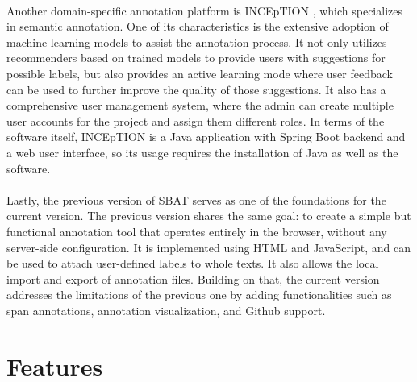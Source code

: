 \documentclass[12ptm a4paper]{article}
\begin{document}
\\
Another domain-specific annotation platform is INCEpTION \citep{klie-etal-2018-inception}, which specializes in semantic annotation. One of its characteristics is the extensive adoption of machine-learning models to assist the annotation process. It not only utilizes recommenders based on trained models to provide users with suggestions for possible labels, but also provides an active learning mode where user feedback can be used to further improve the quality of those suggestions. It also has a comprehensive user management system, where the admin can create multiple user accounts for the project and assign them different roles. In terms of the software itself, INCEpTION is a Java application with Spring Boot backend and a web user interface, so its usage requires the installation of Java as well as the software.\\
\\
Lastly, the previous version of SBAT \citep{SBAT} serves as one of the foundations for the current version. The previous version shares the same goal: to create a simple but functional annotation tool that operates entirely in the browser, without any server-side configuration. It is implemented using HTML and JavaScript, and can be used to attach user-defined labels to whole texts. It also allows the local import and export of annotation files. Building on that, the current version addresses the limitations of the previous one by adding functionalities such as span annotations, annotation visualization, and Github support.
\newpage
\section{Features}
\end{document}
